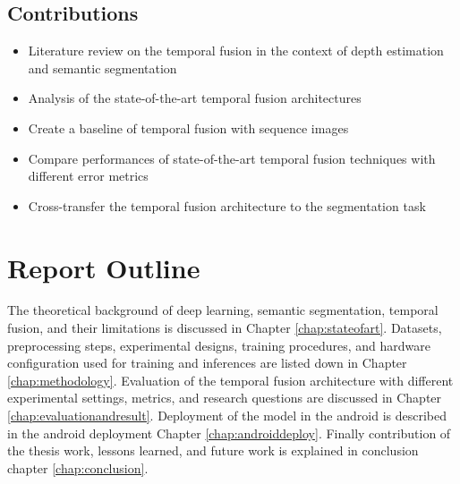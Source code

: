     \subsection{Contributions}
    
    \begin{itemize}
    	\item Literature review on the temporal fusion in the context of depth estimation and semantic segmentation
    	\item Analysis of the state-of-the-art temporal fusion architectures
    	\item Create a baseline of temporal fusion with sequence images
    	\item  Compare performances of state-of-the-art temporal fusion techniques with different error metrics
    	\item Cross-transfer the temporal fusion architecture to the segmentation task
  
	\end{itemize}
    \section{Report Outline}
    
    The theoretical background of deep learning, semantic segmentation, temporal fusion, and their limitations is discussed in Chapter \ref{chap:stateofart}. Datasets, preprocessing steps, experimental designs, training procedures, and hardware configuration used for training and inferences are listed down in Chapter \ref{chap:methodology}. Evaluation of the temporal fusion architecture with different experimental settings, metrics, and research questions are discussed in Chapter \ref{chap:evaluationandresult}. Deployment of the model in the android is described in the android deployment Chapter \ref{chap:androiddeploy}. Finally contribution of the thesis work, lessons learned, and future work is explained in conclusion chapter \ref{chap:conclusion}. 
    
